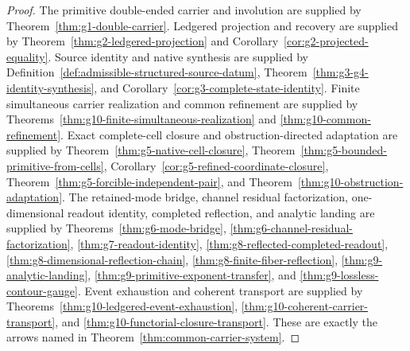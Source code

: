 \documentclass[11pt]{article}
\theoremstyle{definition}
\begin{document}
\begin{proof}
The primitive double-ended carrier and involution are supplied by
Theorem~\ref{thm:g1-double-carrier}.  Ledgered projection and recovery are
supplied by Theorem~\ref{thm:g2-ledgered-projection} and
Corollary~\ref{cor:g2-projected-equality}.  Source identity and native
synthesis are supplied by
Definition~\ref{def:admissible-structured-source-datum},
Theorem~\ref{thm:g3-g4-identity-synthesis}, and
Corollary~\ref{cor:g3-complete-state-identity}.  Finite simultaneous carrier
realization and common refinement are supplied by
Theorems~\ref{thm:g10-finite-simultaneous-realization} and
\ref{thm:g10-common-refinement}.  Exact complete-cell closure and
obstruction-directed adaptation are supplied by
Theorem~\ref{thm:g5-native-cell-closure},
Theorem~\ref{thm:g5-bounded-primitive-from-cells},
Corollary~\ref{cor:g5-refined-coordinate-closure},
Theorem~\ref{thm:g5-forcible-independent-pair}, and
Theorem~\ref{thm:g10-obstruction-adaptation}.  The retained-mode bridge,
channel residual factorization, one-dimensional readout identity, completed
reflection, and analytic landing are supplied by
Theorems~\ref{thm:g6-mode-bridge},
\ref{thm:g6-channel-residual-factorization},
\ref{thm:g7-readout-identity}, \ref{thm:g8-reflected-completed-readout},
\ref{thm:g8-dimensional-reflection-chain},
\ref{thm:g8-finite-fiber-reflection}, \ref{thm:g9-analytic-landing},
\ref{thm:g9-primitive-exponent-transfer}, and
\ref{thm:g9-lossless-contour-gauge}.  Event exhaustion and coherent transport
are supplied by Theorems~\ref{thm:g10-ledgered-event-exhaustion},
\ref{thm:g10-coherent-carrier-transport}, and
\ref{thm:g10-functorial-closure-transport}.  These are exactly the
arrows named in Theorem~\ref{thm:common-carrier-system}.
\end{proof}
\end{document}
